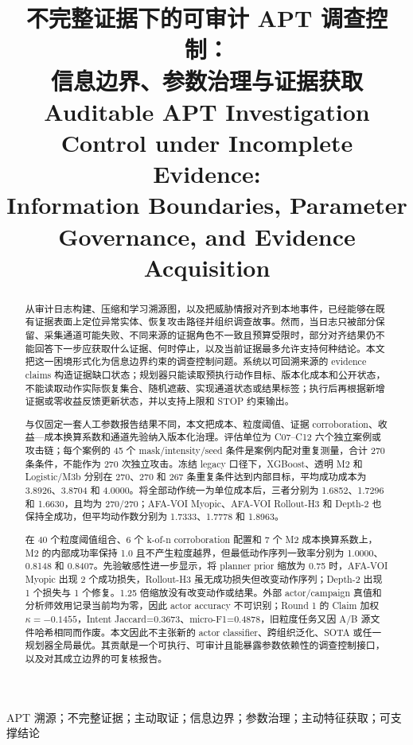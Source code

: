 \documentclass[conference,a4paper,10pt]{IEEEtran}
\title{不完整证据下的可审计 APT 调查控制：\\
信息边界、参数治理与证据获取\\[-0.1em]
{\large Auditable APT Investigation Control under Incomplete Evidence:\\
Information Boundaries, Parameter Governance, and Evidence Acquisition}}
\author{\IEEEauthorblockN{匿名作者}
\IEEEauthorblockA{匿名单位\\anonymous@example.com}}
\begin{document}
\maketitle

\begin{abstract}
从审计日志构建、压缩和学习溯源图，以及把威胁情报对齐到本地事件，已经能够在既有证据表面上定位异常实体、恢复攻击路径并组织调查故事。然而，当日志只被部分保留、采集通道可能失败、不同来源的证据角色不一致且预算受限时，部分对齐结果仍不能回答下一步应获取什么证据、何时停止，以及当前证据最多允许支持何种结论。本文把这一困境形式化为信息边界约束的调查控制问题。系统以可回溯来源的 evidence claims 构造证据缺口状态；规划器只能读取预执行动作目标、版本化成本和公开状态，不能读取动作实际恢复集合、随机遮蔽、实现通道状态或结果标签；执行后再根据新增证据或零收益反馈更新状态，并以支持上限和 STOP 约束输出。

与仅固定一套人工参数报告结果不同，本文把成本、粒度阈值、证据 corroboration、收益—成本换算系数和通道先验纳入版本化治理。评估单位为 C07–C12 六个独立案例或攻击链；每个案例的 45 个 mask/intensity/seed 条件是案例内配对重复测量，合计 270 条条件，不能作为 270 次独立攻击。冻结 legacy 口径下，XGBoost、透明 M2 和 Logistic/M3b 分别在 270、270 和 267 条重复条件达到内部目标，平均成功成本为 3.8926、3.8704 和 4.0000。将全部动作统一为单位成本后，三者分别为 1.6852、1.7296 和 1.6630，且均为 270/270；AFA-VOI Myopic、AFA-VOI Rollout-H3 和 Depth-2 也保持全成功，但平均动作数分别为 1.7333、1.7778 和 1.8963。

在 40 个粒度阈值组合、6 个 k-of-n corroboration 配置和 7 个 M2 成本换算系数上，M2 的内部成功率保持 1.0 且不产生粒度越界，但最低动作序列一致率分别为 1.0000、0.8148 和 0.8407。先验敏感性进一步显示，将 planner prior 缩放为 0.75 时，AFA-VOI Myopic 出现 2 个成功损失，Rollout-H3 虽无成功损失但改变动作序列；Depth-2 出现 1 个损失与 1 个修复。1.25 倍缩放没有改变动作或结果。外部 actor/campaign 真值和分析师效用记录当前均为零，因此 actor accuracy 不可识别；Round 1 的 Claim 加权 $\kappa=-0.1455$，Intent Jaccard=0.3673、micro-F1=0.4878，旧粒度任务又因 A/B 源文件哈希相同而作废。本文因此不主张新的 actor classifier、跨组织泛化、SOTA 或任一规划器全局最优。其贡献是一个可执行、可审计且能暴露参数依赖性的调查控制接口，以及对其成立边界的可复核报告。

\end{abstract}

\begin{IEEEkeywords}
APT 溯源；不完整证据；主动取证；信息边界；参数治理；主动特征获取；可支撑结论
\end{IEEEkeywords}
\end{document}
